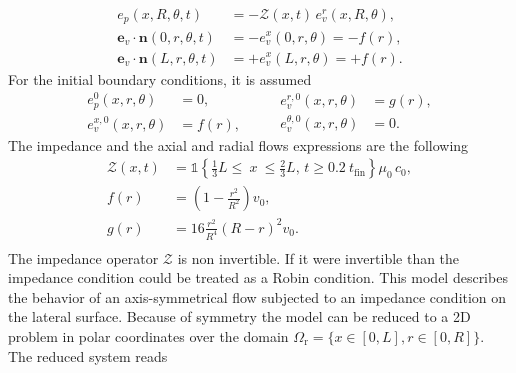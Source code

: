 \begin{align*}
e_p(x, R, \theta, t) &= - \mathcal{Z}(x, t) \, e_v^r(x, R, \theta), \\
\bm{e}_v \cdot \bm{n}(0, r, \theta, t) &= -e_v^x(0, r, \theta) = - f(r), \\
\bm{e}_v \cdot \bm{n}(L, r, \theta, t) &= +e_v^x(L, r, \theta) = + f(r).
\end{align*}
For the initial boundary conditions, it is assumed
\begin{equation}
\label{eq:init_con}
\begin{aligned}
e_p^0(x, r, \theta) &= 0, \\
e_v^{x, 0}(x, r, \theta) &= f(r), 
\end{aligned}  \qquad
\begin{aligned}
e_v^{r, 0}(x, r, \theta) &= g(r), \\
e_v^{\theta, 0}(x, r, \theta) &= 0.
\end{aligned}    
\end{equation}
The impedance and the axial and radial flows expressions are the following
\begin{equation*}
\begin{aligned}
\mathcal{Z}(x, t) &= \mathds{1}\left\{ \frac{1}{3} L \leq \ x \ \leq \frac{2}{3} L, \,  t \geq 0.2 \ t_{\text{fin}} \right\} \mu_0 \, c_0, \\
f(r) &= \left( 1 - \frac{r^2}{R^2} \right) v_0, \\
g(r) &= 16 \frac{r^2}{R^4} \left( R - r \right)^2 v_0. \\
\end{aligned}
\end{equation*}
The impedance operator $\mathcal{Z}$ is non invertible. If it were invertible than the impedance condition could be treated as a Robin condition. This model describes the behavior of an axis-symmetrical flow subjected to an impedance condition on the lateral surface. Because of symmetry the model can be reduced to a 2D problem in polar coordinates over the domain $\Omega_{\text{r}} = \{x \in [0, L], r \in [0, R]\}$. The reduced system reads
